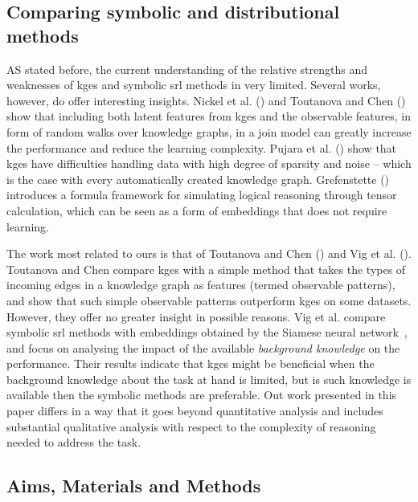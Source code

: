 \subsection{Comparing symbolic and distributional methods}


AS stated before, the current understanding of the relative strengths and weaknesses of \gls{kge}s and symbolic \gls{srl} methods in very limited.
Several works, however, do offer interesting insights.
Nickel et al. (\cite{NickleNIPS2014}) and Toutanova and Chen (\cite{toutanova2015observed}) show that including both latent features from \gls{kge}s and the observable features, in form of random walks over knowledge graphs, in a join model can greatly increase the performance and reduce the learning complexity.
Pujara et al. (\cite{pujara:emnlp17}) show that \gls{kge}s have difficulties handling data with high degree of sparsity and noise -- which is the case with every automatically created knowledge graph.
Grefenstette (\cite{GrefenstetteTFDS}) introduces a formula framework for simulating logical reasoning through tensor calculation, which can be seen as a form of embeddings that does not require learning.


The work most related to ours is that of Toutanova and Chen (\cite{toutanova2015observed}) and Vig et al. (\cite{VigILP2017}).
Toutanova and Chen compare \gls{kge}s with a simple method that takes the types of incoming edges in a knowledge graph as features (termed observable patterns), and show that such simple observable patterns outperform \gls{kge}s on some datasets.
However, they offer no greater insight in possible reasons.
Vig et al.  compare symbolic \gls{srl} methods with embeddings obtained by the Siamese neural network~\cite{Bromley:1993:SVU:2987189.2987282}, and focus on analysing the impact of the available \textit{background knowledge} on the performance.
Their results indicate that \gls{kge}s might be beneficial when the background knowledge about the task at hand is limited, but is such knowledge is available then the symbolic methods are preferable.
Out work presented in this paper differs in a way that it goes beyond quantitative analysis and includes substantial qualitative analysis with respect to the complexity of reasoning needed to address the task.



\subsection{Aims, Materials and Methods}

